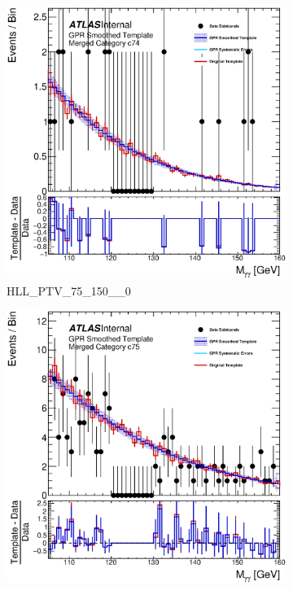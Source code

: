 \begin{figure}
\begin{center}
\begin{subfigure}[T]{0.49\linewidth}
	\centering
	\includegraphics[width=\linewidth]{figures/background/gpr/coupCatTemplates/GPR_Smoothed_Plot_hmgg_c74.eps}
	\caption{HLL\_PTV\_75\_150\_\_0}
\end{subfigure}
\begin{subfigure}[T]{0.49\linewidth}
	\centering
	\includegraphics[width=\linewidth]{figures/background/gpr/coupCatTemplates/GPR_Smoothed_Plot_hmgg_c75.eps}

\end{subfigure}
\end{center}
\end{figure}
